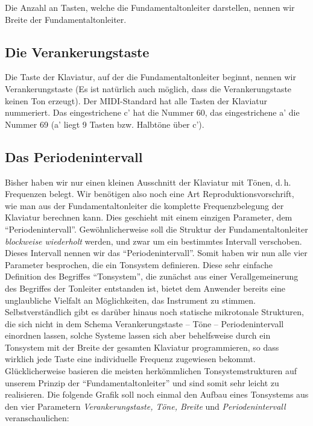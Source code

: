 Die Anzahl an Tasten, welche die Fundamentaltonleiter  darstellen,
nennen wir Breite der Fundamentaltonleiter.

\subsection{Die Verankerungstaste}\label{sec:die-verank}
Die Taste der Klaviatur, auf der die Fundamentaltonleiter beginnt, nennen wir
Verankerungstaste (Es ist natürlich auch möglich, dass die
Verankerungstaste keinen Ton erzeugt). Der MIDI-Standard hat alle
Tasten der Klaviatur nummeriert. Das eingestrichene c' hat die
Nummer 60, das eingestrichene a' die Nummer 69 (a' liegt 9
Tasten bzw. Halbtöne über c').

\subsection{Das Periodenintervall}\label{sec:das-peri}

Bisher haben wir nur einen kleinen Ausschnitt der Klaviatur mit Tönen,
d.\,h. Frequenzen belegt. Wir benötigen also noch eine Art
Reproduktionsvorschrift, wie man aus der Fundamentaltonleiter die komplette
Frequenzbelegung der Klaviatur
berechnen kann. Dies geschieht mit einem einzigen Parameter, dem
"`Periodenintervall"'. Gewöhnlicherweise soll die Struktur der
Fundamentaltonleiter \emph{blockweise wiederholt} werden, und zwar um
ein bestimmtes Intervall verschoben. Dieses Intervall nennen wir das
"`Periodenintervall"'.  Somit haben wir nun
alle vier Parameter besprochen, die ein Tonsystem definieren. Diese
sehr einfache Definition des Begriffes "`Tonsystem"', die zunächst aus
einer Verallgemeinerung des Begriffes der Tonleiter entstanden ist,
bietet dem Anwender bereits eine unglaubliche Vielfalt an
Möglichkeiten, das Instrument zu stimmen. Selbstverständlich gibt es
darüber hinaus noch statische mikrotonale Strukturen, die sich nicht in
dem Schema Verankerungstaste -- Töne -- Periodenintervall einordnen
lassen, solche Systeme lassen sich aber behelfsweise durch ein
Tonsystem mit der Breite der gesamten Klaviatur programmieren, so dass
wirklich jede Taste eine individuelle Frequenz zugewiesen bekommt.
Glücklicherweise basieren die meisten herkömmlichen
Tonsystemstrukturen auf unserem Prinzip der "`Fundamentaltonleiter"'
und sind somit sehr leicht zu realisieren. Die folgende Grafik soll
noch einmal den Aufbau eines Tonsystems aus den vier Parametern {\it
  Verankerungstaste, Töne, Breite \/} und \emph{Periodenintervall}
veranschaulichen:

